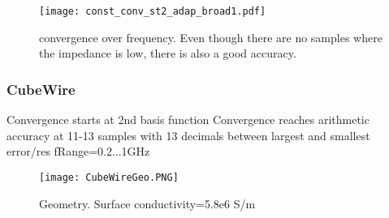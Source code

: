 \begin{figure}[h]
	\centering
	\texttt{[image: const\_conv\_st2\_adap\_broad1.pdf]}
	\caption{convergence over frequency. Even though there are no samples where the impedance is low, there is also a good accuracy.}
	\label{}
\end{figure}


\subsubsection{CubeWire}
Convergence starts at 2nd basis function
Convergence reaches arithmetic accuracy at 11-13 samples with 13 decimals between largest and smallest error/res
fRange=0.2...1GHz

\begin{figure}[h]
	\centering
	\texttt{[image: CubeWireGeo.PNG]}
	\caption{Geometry. Surface conductivity=5.8e6 S/m}
	\label{}
\end{figure}














